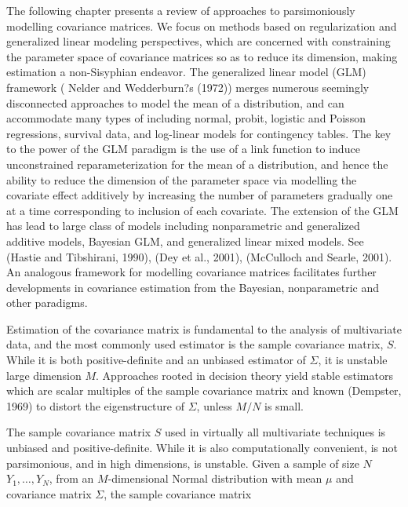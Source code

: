 \documentclass[12pt]{article}
\newcommand*\needsparaphrased{\color{red}}
\theoremstyle{definition}
\begin{document}
The following chapter presents a review of approaches to parsimoniously modelling covariance matrices. We focus on methods based on regularization and generalized linear modeling perspectives, which are concerned with constraining the parameter space of covariance matrices so as to reduce its dimension, making estimation a non-Sisyphian endeavor. The generalized linear model (GLM) framework ( Nelder and Wedderburn?s (1972)) merges numerous seemingly disconnected approaches to model the mean of a distribution, and can accommodate many types of including normal, probit, logistic and Poisson regressions, survival data, and log-linear models for contingency tables. The key to the power of the GLM paradigm is the use of a link function to induce unconstrained reparameterization for the mean of a distribution, and hence the ability to reduce the dimension of the parameter space via modelling the
covariate effect additively by increasing the number of parameters gradually one at a time corresponding to inclusion of each covariate. The extension of the GLM has lead to large class of models including nonparametric and generalized additive models, Bayesian GLM, and generalized linear mixed models. See  (Hastie and Tibshirani, 1990),  (Dey et al., 2001),  (McCulloch and Searle, 2001). An analogous framework for modelling covariance matrices facilitates further developments in covariance estimation from the Bayesian, nonparametric and other paradigms.

\bigskip

Estimation of the covariance matrix is fundamental to the analysis of multivariate data, and the most commonly used estimator is the sample covariance matrix, $S$. While it is both positive-definite and an unbiased estimator of $\Sigma$, it is unstable large dimension $M$. Approaches rooted in decision theory yield stable estimators which are scalar multiples of the sample covariance matrix and known (Dempster, 1969) to distort the eigenstructure of $\Sigma$, unless $M/N$ is small. {\needsparaphrased{A vast and growing literature on the problem of efficient estimation of the covariance matrix Σ of a normal distribution has focused on either ’correcting’ this distortion in the eigenstructure and/or reducing the number of parameters to be estimated (Stein, 1975; Lin and Perlman, 1985; Yang and Berger, 1994; Daniels and Kass, 1999; Champion, 2003; Wong, Carter and}} 

\bigskip


The sample covariance matrix $S$ used in virtually all multivariate techniques is unbiased and positive-definite. While it is also computationally convenient, is not parsimonious, and in high dimensions, is unstable. Given a sample of size $N$ $Y_1,\dots , Y_N$, from an $M$-dimensional Normal distribution with mean $\mu$ and covariance matrix $\Sigma$, the sample covariance matrix
\end{document}
